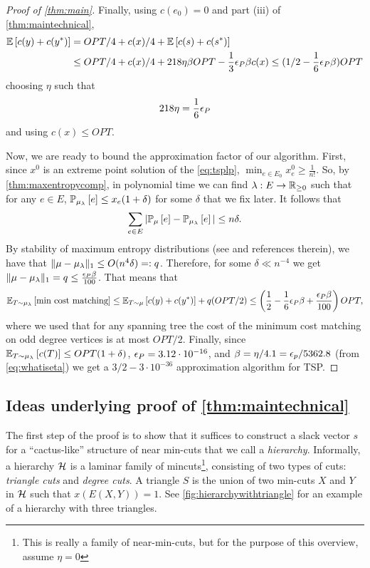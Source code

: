 \begin{proof}[Proof of \cref{thm:main}]
Finally, using $c(e_0)=0$ and part (iii) of \cref{thm:maintechnical},
\begin{align*}
{\mathbb{E}}\left[c(y)+c(y^*)\right]&= OPT/4 + c(x)/4 +  	{\mathbb{E}}\left[c(s)+c(s^*)\right]\\
&\leq OPT/4+c(x)/4 +218\eta \beta OPT - \frac{1}{3}{\epsilon}_P \beta c(x) \leq (1/2-\frac{1}{6}{\epsilon}_P\beta) OPT
\end{align*}
choosing $\eta$ such that 
\begin{equation}\label{eq:whatiseta}
	218\eta= \frac{1}{6}{\epsilon}_P
\end{equation}
and using $c(x) \leq OPT$.

Now, we are ready to bound the approximation factor of our algorithm.
First, since $x^0$ is an  extreme point solution of the \ref{eq:tsplp}, $\min_{e\in E_0} x^0_e\geq \frac{1}{n!}$. So, by \cref{thm:maxentropycomp}, in polynomial time we can find $\lambda:E\to\mathbb{R}_{\geq 0}$ such that for any $e\in E$, ${\mathbb{P}}_{\mu_\lambda}\left[e\right]\leq x_e(1+\delta)$ for some $\delta$ that we fix later. It follows that
$$ \sum_{e\in E} |{\mathbb{P}}_{\mu}\left[e\right] - {\mathbb{P}}_{\mu_{\lambda}}\left[e\right]| \leq n\delta.$$
By stability of maximum entropy distributions (see  \cite[Thm 4]{SV19} and references therein), we have that $\|\mu-\mu_\lambda\|_1\leq O(n^4\delta)=:q$. Therefore, {for some $\delta \ll n^{-4}$ we get} $\|\mu-\mu_{\lambda}\|_1=q\leq \frac{{\epsilon}_P\beta}{100}$. That means that 
$$ {\mathbb{E}}_{T\sim\mu_{\lambda}}\left[\text{min cost matching}\right] \leq {\mathbb{E}}_{T\sim\mu}\left[c(y)+c(y^*)\right]+  q (OPT/2) \leq \left(\frac12-\frac{1}{6}{\epsilon}_P\beta
 + \frac{{\epsilon}_P \beta }{100}\right)OPT, $$
where we used that for any spanning tree the cost of the minimum cost matching on odd degree vertices is at most $OPT/2$.
Finally, since ${\mathbb{E}}_{T\sim\mu_\lambda}\left[c(T)\right]\leq OPT(1+\delta)$, ${\epsilon}_P=3.12\cdot 10^{-16}$, and $\beta = \eta/4.1 = {\epsilon}_p/5362.8$ (from \eqref{eq:whatiseta}) we get a $3/2- 3\cdot 10^{-36}$ approximation algorithm for TSP.
\end{proof}

\subsection{Ideas underlying proof of \cref{thm:maintechnical}}\label{sec:maintechnical}
The first step of the proof is to show that it suffices to construct a slack vector $s$ for a ``cactus-like'' structure of near min-cuts that we call a {\em hierarchy}.
Informally, a hierarchy $\mathcal{H}$ is a laminar family of mincuts\footnote{This is really a family of near-min-cuts, but for the purpose of this overview, assume $\eta =0$}, consisting of two types of cuts: {\em triangle cuts} and {\em degree cuts}. A triangle  $S$ is the union of two min-cuts $X$ and $Y$ in $\mathcal{H}$ such that $x(E(X,Y)) = 1$. 
See \cref{fig:hierarchywithtriangle} for an example of a hierarchy with three triangles.

